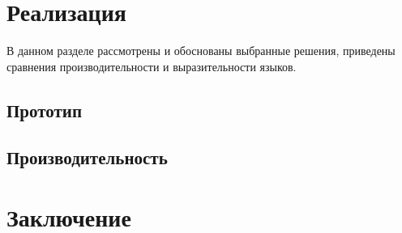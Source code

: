\documentclass{spbau-diploma}
\begin{document}
\section{Реализация}
В данном разделе рассмотрены и обоснованы выбранные решения, приведены сравнения производительности и выразительности языков.

\subsection{Прототип}
\subsection{Производительность}

\section*{Заключение}



\end{document}
